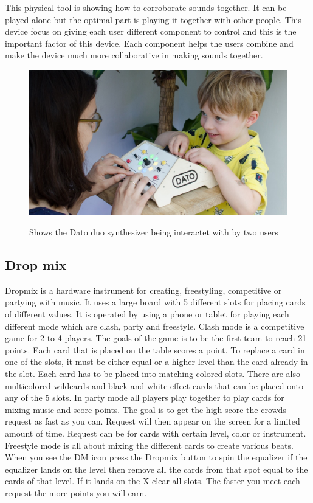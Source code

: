 This physical tool is showing how to corroborate sounds together. It can be played alone but the optimal part is playing it together with other people. This device focus on giving each user different component to control and this is the important factor of this device. Each component helps the users combine and make the device much more collaborative in making sounds together.
\begin{figure}[H]
	\centering
	\includegraphics[width=0.7\linewidth]{figure/Analysis/datoduo}
	\label{fig:datoduo}
	\caption{Shows the Dato duo synthesizer being interactet with by two users}
\end{figure}

\subsection{Drop mix}
Dropmix is a hardware instrument for creating, freestyling, competitive or partying with music. It uses a large board with 5 different slots for placing cards of different values. It is operated by using a phone or tablet for playing each different mode which are clash, party and freestyle. Clash mode is a competitive game for 2 to 4 players. The goals of the game is to be the first team to reach 21 points. Each card that is placed on the table scores a point. To replace a card in one of the slots, it must be either equal or a higher level than the card already in the slot. Each card has to be placed into matching colored slots. There are also multicolored wildcards and black and white effect cards that can be placed onto any of the 5 slots. In party mode all players play together to play cards for mixing music and score points. The goal is to get the high score the crowds request as fast as you can. Request will then appear on the screen for a limited amount of time. Request can be for cards with certain level, color or instrument. Freestyle mode is all about mixing the different cards to create various beats. When you see the DM icon press the Dropmix button to spin the equalizer if the equalizer lands on the level then remove all the cards from that spot equal to the cards of that level. If it lands on the X clear all slots. The faster you meet each request the more points you will earn. 

